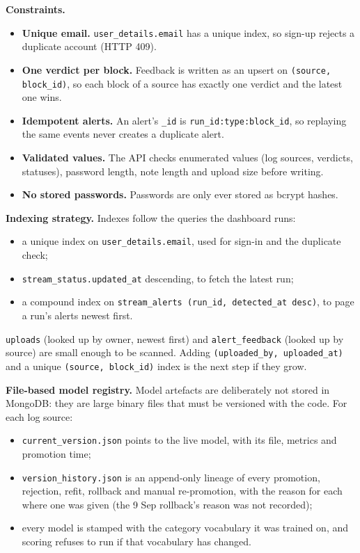 \textbf{Constraints.}
\begin{itemize}
  \item \textbf{Unique email.} \texttt{user\_details.email} has a unique index, so sign-up rejects a duplicate account (HTTP 409).
  \item \textbf{One verdict per block.} Feedback is written as an upsert on \texttt{(source, block\_id)}, so each block of a source has exactly one verdict and the latest one wins.
  \item \textbf{Idempotent alerts.} An alert's \texttt{\_id} is \texttt{run\_id:type:block\_id}, so replaying the same events never creates a duplicate alert.
  \item \textbf{Validated values.} The API checks enumerated values (log sources, verdicts, statuses), password length, note length and upload size before writing.
  \item \textbf{No stored passwords.} Passwords are only ever stored as bcrypt hashes.
\end{itemize}

\textbf{Indexing strategy.} Indexes follow the queries the dashboard runs:
\begin{itemize}
  \item a unique index on \texttt{user\_details.email}, used for sign-in and the duplicate check;
  \item \texttt{stream\_status.updated\_at} descending, to fetch the latest run;
  \item a compound index on \texttt{stream\_alerts (run\_id, detected\_at desc)}, to page a run's alerts newest first.
\end{itemize}
\texttt{uploads} (looked up by owner, newest first) and \texttt{alert\_feedback} (looked up by source) are small enough to be scanned. Adding \texttt{(uploaded\_by, uploaded\_at)} and a unique \texttt{(source, block\_id)} index is the next step if they grow.

\textbf{File-based model registry.} Model artefacts are deliberately not stored in MongoDB: they are large binary files that must be versioned with the code. For each log source:
\begin{itemize}
  \item \texttt{current\_version.json} points to the live model, with its file, metrics and promotion time;
  \item \texttt{version\_history.json} is an append-only lineage of every promotion, rejection, refit, rollback and manual re-promotion, with the reason for each where one was given (the 9 Sep rollback's reason was not recorded);
  \item every model is stamped with the category vocabulary it was trained on, and scoring refuses to run if that vocabulary has changed.
\end{itemize}

